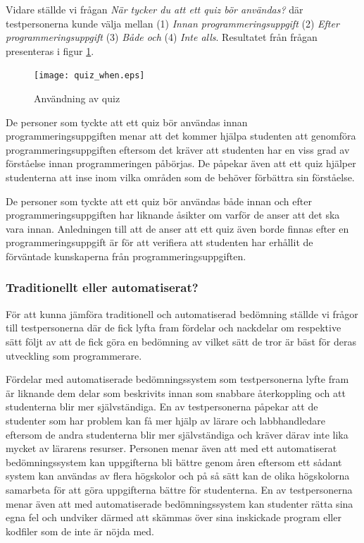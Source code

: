 \documentclass[a4paper,11pt]{article}
\begin{document}
{Vidare ställde vi frågan \textit{När tycker du att ett quiz bör användas?} där testpersonerna kunde välja mellan (1) \textit{Innan programmeringsuppgift} (2) \textit{Efter programmeringsuppgift} (3) \textit{Både och} (4) \textit{Inte alls}. Resultatet från frågan presenteras i figur \ref{fig:QuizWhen}.

\begin{figure}[ht!]
\centering
\texttt{[image: quiz\_when.eps]}
\caption{Användning av quiz}
\label{fig:QuizWhen}
\end{figure}

De personer som tyckte att ett quiz bör användas innan programmeringsuppgiften menar att det kommer hjälpa studenten att genomföra programmeringsuppgiften eftersom det kräver att studenten har en viss grad av förståelse innan programmeringen påbörjas. De påpekar även att ett quiz hjälper studenterna att inse inom vilka områden som de behöver förbättra sin förståelse. 

De personer som tyckte att ett quiz bör användas både innan och efter programmeringsuppgiften har liknande åsikter om varför de anser att det ska vara innan. Anledningen till att de anser att ett quiz även borde finnas efter en programmeringsuppgift är för att verifiera att studenten har erhållit de förväntade kunskaperna från programmeringsuppgiften. 

\subsubsection{Traditionellt eller automatiserat?}

För att kunna jämföra traditionell och automatiserad bedömning ställde vi frågor till testpersonerna där de fick lyfta fram fördelar och nackdelar om respektive sätt följt av att de fick göra en bedömning av vilket sätt de tror är bäst för deras utveckling som programmerare.

Fördelar med automatiserade bedömningssystem som testpersonerna lyfte fram är liknande dem delar som beskrivits innan som snabbare återkoppling och att studenterna blir mer självständiga. En av testpersonerna påpekar att de studenter som har problem kan få mer hjälp av lärare och labbhandledare eftersom de andra studenterna blir mer självständiga och kräver därav inte lika mycket av lärarens resurser. Personen menar även att med ett automatiserat bedömningssystem kan uppgifterna bli bättre genom åren eftersom ett sådant system kan användas av flera högskolor och på så sätt kan de olika högskolorna samarbeta för att göra uppgifterna bättre för studenterna. En av testpersonerna menar även att med automatiserade bedömningssystem kan studenter rätta sina egna fel och undviker därmed att skämmas över sina inskickade program eller kodfiler som de inte är nöjda med.

}
\end{document}
